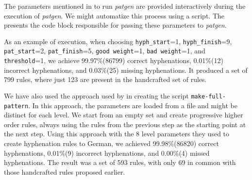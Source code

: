 The parameters mentioned in  to run \emph{patgen} are provided interactively during the execution of \emph{patgen}.
We might automatize this process using a script. The  presents the code block
responsible for passing these parameters to \emph{patgen}.

As an example of execution, when choosing \texttt{hyph\_start}=1, \texttt{hyph\_finish}=9, \texttt{pat\_start}=2, \texttt{pat\_finish}=5,
\texttt{good weight}=1, \texttt{bad weight}=1, and \texttt{threshold}=1, we achieve 99.97\%(86799) correct 
hyphenations, 0.01\%(12) incorrect hyphenations, and 0.03\%(25) missing hyphenations.
It produced a set of 799 rules, where just 123 are present in the handcrafted set of rules.

We have also used the approach used by \textcite{sojka2019} in creating the script \texttt{make-full-pattern}.
In this approach, the parameters are loaded from a file and might be distinct for each level.
We start from an empty set and create progressive higher order rules, always using the rules from the previous
step as the starting point at the next step.
Using this approach with the 8 level parameters they used to create hyphenation rules to German,
we achieved 99.98\%(86820) correct hyphenations, 0.01\%(9) incorrect hyphenations, and 0.00\%(4) missed hyphenations.
The result was a set of 593 rules, with only 69 in common with those handcrafted rules proposed earlier.






